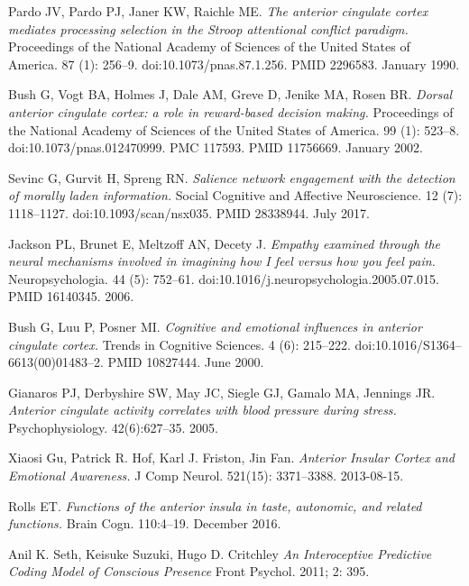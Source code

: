 \documentclass[a4paper, amsfonts, amssymb, amsmath, reprint, showkeys, nofootinbib, twoside]{revtex4-1}
\begin{document}
\begin{thebibliography}{99}
  Pardo JV, Pardo PJ, Janer KW, Raichle ME.
  \textit{The anterior cingulate cortex mediates processing selection in the Stroop
    attentional conflict paradigm.}
  Proceedings of the National Academy of Sciences of the United States of
  America. 87 (1): 256–9. doi:10.1073/pnas.87.1.256. PMID 2296583. January 1990.

  Bush G, Vogt BA, Holmes J, Dale AM, Greve D, Jenike MA, Rosen BR.
  \textit{Dorsal anterior cingulate cortex: a role in reward-based decision making.}
  Proceedings of the National Academy of Sciences of the United States of
  America. 99 (1): 523–8. doi:10.1073/pnas.012470999. PMC 117593. PMID
  11756669. January 2002.

  Sevinc G, Gurvit H, Spreng RN.
  \textit{Salience network engagement with the detection of morally laden
    information.}
  Social Cognitive and Affective Neuroscience. 12 (7):
  1118–1127. doi:10.1093/scan/nsx035. PMID 28338944. July 2017.

  Jackson PL, Brunet E, Meltzoff AN, Decety J.
  \textit{Empathy examined through the neural mechanisms involved in imagining how I
    feel versus how you feel pain.}
  Neuropsychologia. 44 (5): 752–61. doi:10.1016/j.neuropsychologia.2005.07.015. PMID
  16140345. 2006.

  Bush G, Luu P, Posner MI.
  \textit{Cognitive and emotional influences in anterior cingulate cortex.}
  Trends in Cognitive Sciences. 4 (6):
  215–222. doi:10.1016/S1364–6613(00)01483–2. PMID 10827444. June 2000.

  Gianaros PJ, Derbyshire SW, May JC, Siegle GJ, Gamalo MA, Jennings JR.
  \textit{Anterior cingulate activity correlates with blood pressure during
    stress.}
  Psychophysiology. 42(6):627–35. 2005.

  Xiaosi Gu, Patrick R. Hof, Karl J. Friston, Jin Fan.
  \textit{Anterior Insular Cortex and Emotional Awareness.}
  J Comp Neurol. 521(15): 3371–3388. 2013-08-15.

  Rolls ET.
  \textit{Functions of the anterior insula in taste, autonomic, and related
    functions.}
  Brain Cogn. 110:4–19. December 2016.

  Anil K. Seth, Keisuke Suzuki, Hugo D. Critchley
  \textit {An Interoceptive Predictive Coding Model of Conscious Presence}
  Front Psychol. 2011; 2: 395.


\end{thebibliography}
\end{document}
